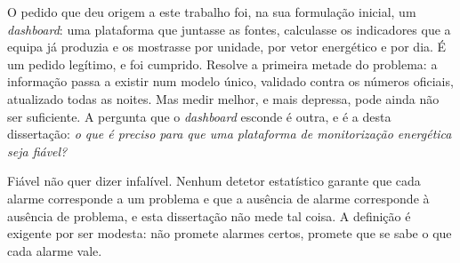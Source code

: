 O pedido que deu origem a este trabalho foi, na sua formulação inicial,
um \emph{dashboard}: uma plataforma que juntasse as fontes, calculasse
os indicadores que a equipa já produzia e os mostrasse por unidade, por
vetor energético e por dia. É um pedido legítimo, e foi cumprido. Resolve
a primeira metade do problema: a informação passa a existir num modelo
único, validado contra os números oficiais, atualizado todas as noites.
Mas medir melhor, e mais depressa, pode ainda não ser suficiente. A pergunta que o
\emph{dashboard} esconde é outra, e é a desta dissertação: \emph{o que é
preciso para que uma plataforma de monitorização energética seja
fiável?}

Fiável não quer dizer infalível. Nenhum detetor estatístico garante que
cada alarme corresponde a um problema e que a ausência de alarme
corresponde à ausência de problema, e esta dissertação não mede tal
coisa.  A
definição é exigente por ser modesta: não promete alarmes certos, promete
que se sabe o que cada alarme vale.

